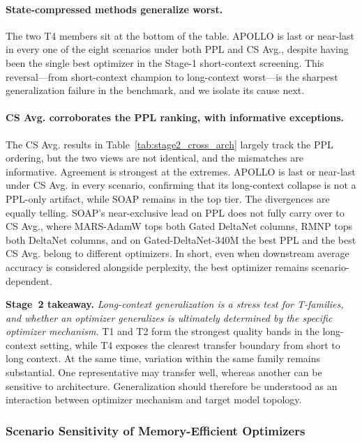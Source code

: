 \paragraph{State-compressed methods generalize worst.}
The two T4 members sit at the bottom of the table. APOLLO is last or near-last
in every one of the eight scenarios under both PPL and CS Avg., despite having
been the single best optimizer in the Stage-1 short-context screening. This
reversal---from short-context champion to long-context worst---is the sharpest
generalization failure in the benchmark, and we isolate its cause next.

\paragraph{CS Avg. corroborates the PPL ranking, with informative exceptions.}
The CS Avg. results in Table~\ref{tab:stage2_cross_arch} largely track the PPL
ordering, but the two views are not identical, and the mismatches are
informative. Agreement is strongest at the extremes. APOLLO is last or
near-last under CS Avg. in every scenario, confirming that its long-context
collapse is not a PPL-only artifact, while SOAP remains in the top tier. The
divergences are equally telling. SOAP's near-exclusive lead on PPL does not
fully carry over to CS Avg., where MARS-AdamW tops both Gated DeltaNet columns, RMNP
tops both DeltaNet columns, and on Gated-DeltaNet-340M the best PPL and the
best CS Avg. belong to different optimizers. In short, even when downstream
average accuracy is considered alongside perplexity, the best optimizer remains
scenario-dependent.

\begin{takeaway}
\noindent\textbf{Stage~2 takeaway.}
\emph{Long-context generalization is a stress test for T-families, and whether
an optimizer generalizes is ultimately determined by the specific optimizer
mechanism.} T1 and T2 form the strongest
quality bands in the long-context setting, while T4 exposes the clearest
transfer boundary from short to long context. At the same time, variation
within the same family remains substantial. One representative may transfer
well, whereas another can be sensitive to architecture. Generalization should
therefore be understood as an interaction between optimizer mechanism and
target model topology.
\end{takeaway}


\subsubsection{Scenario Sensitivity of Memory-Efficient Optimizers}
\label{sec:benchmark-mem-eff-sensitivity}

